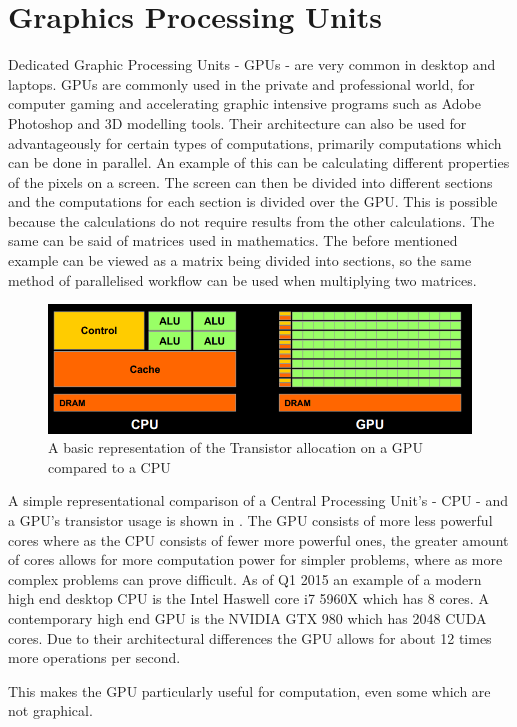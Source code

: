 \section{Graphics Processing Units}
\label{sec:GPU}
Dedicated Graphic Processing Units - GPUs - are very common in desktop and laptops. \citep{STEAMHW}
GPUs are commonly used in the private and professional world, for computer gaming and accelerating graphic intensive programs such as Adobe Photoshop and 3D modelling tools. \citep{NVIDIAADOBE}
Their architecture can also be used for advantageously for certain types of computations, primarily computations which can be done in parallel. 
An example of this can be calculating different properties of the pixels on a screen. 
The screen can then be divided into different sections and the computations for each section is divided over the GPU.
This is possible because the calculations do not require results from the other calculations.
The same can be said of matrices used in mathematics.
The before mentioned example can be viewed as a matrix being divided into sections, so the same method of parallelised workflow can be used when multiplying two matrices.

\begin{figure}[h!]
\centering
 \includegraphics[width=1\textwidth]{figures/GPUCPUimage.png} %
\caption{A basic representation of the Transistor allocation on a GPU compared to a CPU}\label{image:GPUCPUimage} %
\vspace{-15pt}
\end{figure}

A simple representational comparison of a Central Processing Unit's - CPU - and a GPU's transistor usage is shown in .
The GPU consists of more less powerful cores where as the CPU consists of fewer more powerful ones, the greater amount of cores allows for more computation power for simpler problems, where as more complex problems can prove difficult.  
As of Q1 2015 an example of a modern high end desktop CPU is the Intel Haswell core i7 5960X which has 8 cores. \citep{puget}
A contemporary high end GPU is the NVIDIA GTX 980 which has 2048 CUDA cores. \citep{techpowerup,gtx980}
Due to their architectural differences the GPU allows for about 12 times more operations per second.

This makes the GPU particularly useful for computation, even some which are not graphical. %